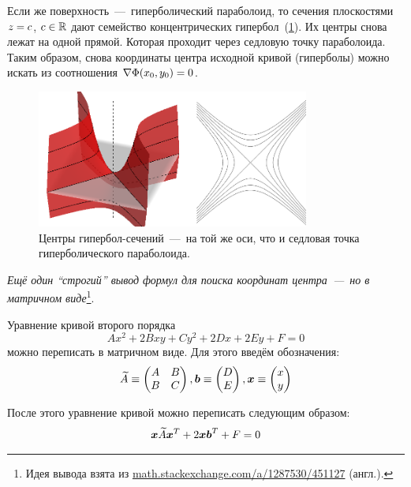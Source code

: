 \documentclass[a4paper,12pt]{article}
\begin{document}
  Если же поверхность~---~гиперболический параболоид, то сечения плоскостями $z \hm= c$, $c \hm\in \RR$ дают семейство концентрических гипербол~(\ref{fig:hyperbolic-paraboloid-for-center}).
  Их центры снова лежат на одной прямой.
  Которая проходит через седловую точку параболоида.
  Таким образом, снова координаты центра исходной кривой (гиперболы) можно искать из соотношения $\nabla \Phi(x_0, y_0) \hm= 0$.
  
  \begin{figure}[h]
    \centering

    \includegraphics[width=0.8\textwidth]{hyperbolic-paraboloid-for-center.png}
  
    \caption{Центры гипербол-сечений~---~на той же оси, что и седловая точка гиперболического параболоида.}
    \label{fig:hyperbolic-paraboloid-for-center}
  \end{figure}
  
  
  \medskip
  
  \emph{Ещё один ``строгий'' вывод формул для поиска координат центра~---~но в матричном виде}\footnote{Идея вывода взята из \href{https://math.stackexchange.com/a/1287530/451127}{math.stackexchange.com/a/1287530/451127} (англ.).}.
  
  Уравнение кривой второго порядка
  \[
    Ax^2 + 2Bxy + Cy^2 + 2Dx + 2Ey + F = 0
  \]
  можно переписать в матричном виде.
  Для этого введём обозначения:
  \[
    \widetilde A \equiv \begin{pmatrix}
      A & B\\
      B & C
    \end{pmatrix}, \boldsymbol b \equiv \begin{pmatrix}
      D \\ E
    \end{pmatrix}, \boldsymbol x \equiv \begin{pmatrix}
      x \\ y
    \end{pmatrix}
  \]
  
  После этого уравнение кривой можно переписать следующим образом:
  \[
    \boldsymbol x \widetilde A \boldsymbol x^T + 2 \boldsymbol x \boldsymbol b^T + F = 0
  \]
  
\end{document}
